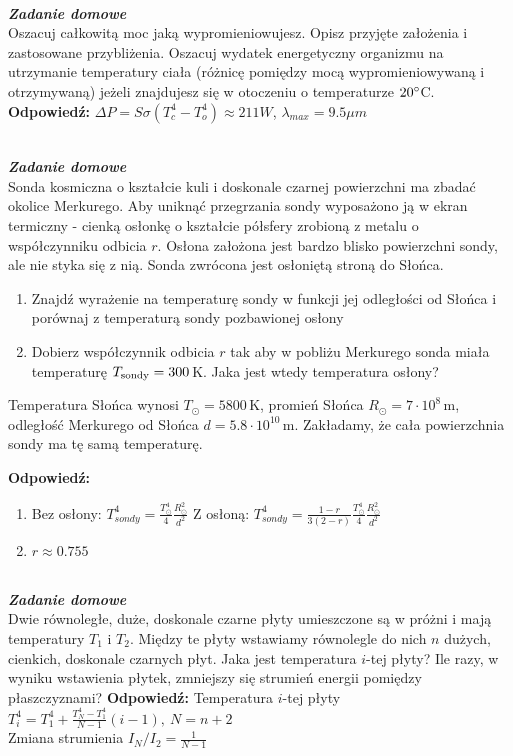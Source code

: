 \documentclass[11pt,a4paper]{article}
\newcounter{zaddom}\newcommand{\zaddom}[1][]{\addtocounter{zaddom}{1} ~\\  {\bf \emph{Zadanie domowe \arabic{zaddom} #1 }} \\}
\begin{document}
\newpage

\zaddom
Oszacuj całkowitą moc jaką wypromieniowujesz. Opisz przyjęte założenia i zastosowane przybliżenia. Oszacuj
wydatek energetyczny organizmu na utrzymanie temperatury ciała (różnicę pomiędzy mocą wypromieniowywaną
i otrzymywaną) jeżeli znajdujesz się w otoczeniu o temperaturze $20\degree$C.
\vskip 10pt
\textbf{Odpowiedź:}
$\Delta P = S \sigma (T_c^4-T_o^4) \approx 211 W$, $\lambda_{max} = 9.5 \mu m$

\zaddom
Sonda kosmiczna o kształcie kuli i doskonale czarnej powierzchni ma zbadać okolice Merkurego. Aby uniknąć
przegrzania sondy wyposażono ją w ekran termiczny - cienką osłonkę o kształcie półsfery zrobioną z metalu
o współczynniku odbicia $r$. Osłona założona jest bardzo blisko powierzchni sondy, ale nie styka się z nią. Sonda
zwrócona jest osłoniętą stroną do Słońca.
\begin{enumerate}
\item Znajdź wyrażenie na temperaturę sondy w funkcji jej odległości od Słońca i porównaj z temperaturą sondy
pozbawionej osłony
\item Dobierz współczynnik odbicia $r$ tak aby w pobliżu Merkurego sonda miała temperaturę $T_{\rm sondy}= 300$\,K. 
Jaka jest wtedy temperatura osłony?
\end{enumerate}
Temperatura Słońca wynosi $T_\odot= 5800$\,K, promień Słońca $R_\odot = 7 \cdot 10^8$\,m, 
odległość Merkurego od Słońca $d = 5.8 \cdot 10^{10}$\,m. 
Zakładamy, że cała powierzchnia sondy ma tę samą temperaturę.

\vskip 10pt
\textbf{Odpowiedź:}
\begin{enumerate}
\item Bez osłony: $T_{sondy}^4 = \frac{T_\odot^4}{4} \frac{R_\odot^2}{d^2}$
Z osłoną: $T_{sondy}^4 = \frac{1-r}{3(2-r)} \frac{T_\odot^4}{4} \frac{R_\odot^2}{d^2}$
\item $r \approx 0.755$
\end{enumerate}

\zaddom
Dwie równoległe, duże, doskonale czarne płyty umieszczone są w próżni i mają temperatury $T_1$ i $T_2$.
Między te płyty wstawiamy równolegle do nich $n$ dużych, cienkich, doskonale czarnych płyt.
Jaka jest temperatura $i$-tej płyty? 
Ile razy, w wyniku wstawienia płytek, zmniejszy się strumień energii pomiędzy płaszczyznami? 
\vskip 10pt
\textbf{Odpowiedź:}
Temperatura $i$-tej płyty $T_i^{4} = T_1^4 + \frac{T_N^4-T_1^4}{N-1} (i-1), ~ N = n+2$\\
Zmiana strumienia $I_N/I_2 = \frac{1}{N-1} $
\end{document}
